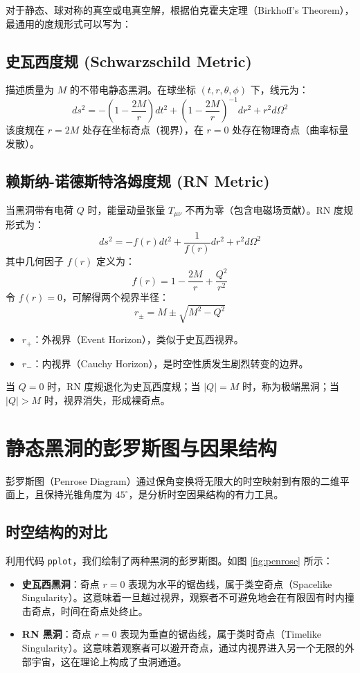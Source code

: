 \documentclass[a4paper,12pt]{article}
\begin{document}
对于静态、球对称的真空或电真空解，根据伯克霍夫定理（Birkhoff's Theorem），最通用的度规形式可以写为：

\subsection{史瓦西度规 (Schwarzschild Metric)}
描述质量为 $M$ 的不带电静态黑洞。在球坐标 $(t, r, \theta, \phi)$ 下，线元为：
\begin{equation}
    ds^2 = -\left(1-\frac{2M}{r}\right)dt^2 + \left(1-\frac{2M}{r}\right)^{-1}dr^2 + r^2 d\Omega^2
\end{equation}
该度规在 $r=2M$ 处存在坐标奇点（视界），在 $r=0$ 处存在物理奇点（曲率标量发散）。

\subsection{赖斯纳-诺德斯特洛姆度规 (RN Metric)}
当黑洞带有电荷 $Q$ 时，能量动量张量 $T_{\mu\nu}$ 不再为零（包含电磁场贡献）。RN 度规形式为：
\begin{equation}
    ds^2 = -f(r)dt^2 + \frac{1}{f(r)}dr^2 + r^2 d\Omega^2
\end{equation}
其中几何因子 $f(r)$ 定义为：
\begin{equation}
    f(r) = 1 - \frac{2M}{r} + \frac{Q^2}{r^2}
\end{equation}
令 $f(r)=0$，可解得两个视界半径：
\begin{equation}
    r_{\pm} = M \pm \sqrt{M^2 - Q^2}
\end{equation}
\begin{itemize}
    \item $r_+$：外视界（Event Horizon），类似于史瓦西视界。
    \item $r_-$：内视界（Cauchy Horizon），是时空性质发生剧烈转变的边界。
\end{itemize}
当 $Q=0$ 时，RN 度规退化为史瓦西度规；当 $|Q|=M$ 时，称为极端黑洞；当 $|Q|>M$ 时，视界消失，形成裸奇点。

\section{静态黑洞的彭罗斯图与因果结构}

彭罗斯图（Penrose Diagram）通过保角变换将无限大的时空映射到有限的二维平面上，且保持光锥角度为 $45^\circ$，是分析时空因果结构的有力工具。

\subsection{时空结构的对比}
利用代码 \texttt{pplot}，我们绘制了两种黑洞的彭罗斯图。如图 \ref{fig:penrose} 所示：
\begin{itemize}
    \item \textbf{史瓦西黑洞}：奇点 $r=0$ 表现为水平的锯齿线，属于类空奇点（Spacelike Singularity）。这意味着一旦越过视界，观察者不可避免地会在有限固有时内撞击奇点，时间在奇点处终止。
    \item \textbf{RN 黑洞}：奇点 $r=0$ 表现为垂直的锯齿线，属于类时奇点（Timelike Singularity）。这意味着观察者可以避开奇点，通过内视界进入另一个无限的外部宇宙，这在理论上构成了虫洞通道。
\end{itemize}
\end{document}

